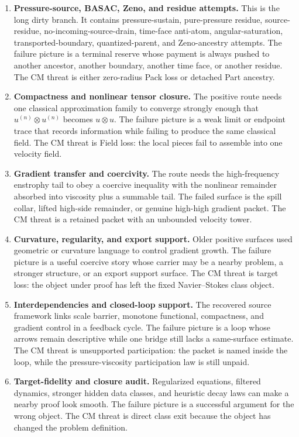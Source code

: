 \documentclass[11pt]{article}
\begin{document}
\begin{enumerate}[leftmargin=2em]
\item \textbf{Pressure-source, BASAC, Zeno, and residue attempts.}
This is the long dirty branch.
It contains pressure-sustain, pure-pressure residue, source-residue, no-incoming-source-drain, time-face anti-atom, angular-saturation, transported-boundary, quantized-parent, and Zeno-ancestry attempts.
The failure picture is a terminal reserve whose payment is always pushed to another ancestor, another boundary, another time face, or another residue.
The CM threat is either zero-radius Pack loss or detached Part ancestry.

\item \textbf{Compactness and nonlinear tensor closure.}
The positive route needs one classical approximation family to converge strongly enough that \(u^{(n)}\otimes u^{(n)}\) becomes \(u\otimes u\).
The failure picture is a weak limit or endpoint trace that records information while failing to produce the same classical field.
The CM threat is Field loss: the local pieces fail to assemble into one velocity field.

\item \textbf{Gradient transfer and coercivity.}
The route needs the high-frequency enstrophy tail to obey a coercive inequality with the nonlinear remainder absorbed into viscosity plus a summable tail.
The failed surface is the spill collar, lifted high-side remainder, or genuine high-high gradient packet.
The CM threat is a retained packet with an unbounded velocity tower.

\item \textbf{Curvature, regularity, and export support.}
Older positive surfaces used geometric or curvature language to control gradient growth.
The failure picture is a useful coercive story whose carrier may be a nearby problem, a stronger structure, or an export support surface.
The CM threat is target loss: the object under proof has left the fixed Navier--Stokes class object.

\item \textbf{Interdependencies and closed-loop support.}
The recovered source framework links scale barrier, monotone functional, compactness, and gradient control in a feedback cycle.
The failure picture is a loop whose arrows remain descriptive while one bridge still lacks a same-surface estimate.
The CM threat is unsupported participation: the packet is named inside the loop, while the pressure-viscosity participation law is still unpaid.

\item \textbf{Target-fidelity and closure audit.}
Regularized equations, filtered dynamics, stronger hidden data classes, and heuristic decay laws can make a nearby proof look smooth.
The failure picture is a successful argument for the wrong object.
The CM threat is direct class exit because the object has changed the problem definition.


\end{enumerate}
\end{document}
